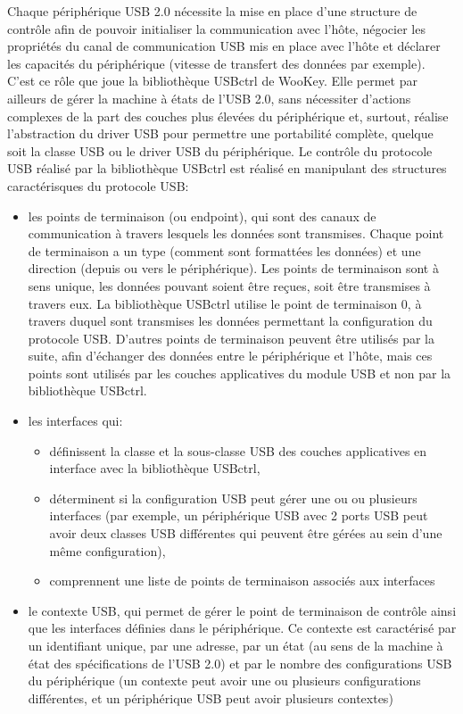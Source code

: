 Chaque périphérique USB 2.0 nécessite la mise en place d'une structure de contrôle afin de pouvoir initialiser la communication avec l'hôte, négocier les propriétés du canal de communication USB mis en place avec l'hôte et déclarer les capacités du périphérique (vitesse de transfert des données par exemple).
\noindent C'est ce rôle que joue la bibliothèque USBctrl de WooKey. Elle permet par ailleurs de gérer la machine à états de l'USB 2.0, sans nécessiter d'actions complexes de la part des couches plus élevées du périphérique et, surtout, réalise l'abstraction du driver USB pour permettre une portabilité complète, quelque soit la classe USB ou le driver USB du périphérique.
\newline \noindent Le contrôle du protocole USB réalisé par la bibliothèque USBctrl est réalisé en manipulant des structures caractérisques du protocole USB:
\begin{itemize}
	\item les points de terminaison (ou endpoint), qui sont des canaux de communication à travers lesquels les données sont transmises. Chaque point de terminaison a un type (comment sont formattées les données) et une direction (depuis ou vers le périphérique). Les points de terminaison sont à sens unique, les données pouvant soient être reçues, soit être transmises à travers eux. La bibliothèque USBctrl utilise le point de terminaison 0, à travers duquel sont transmises les données permettant la configuration du protocole USB. D'autres points de terminaison peuvent être utilisés par la suite, afin d'échanger des données entre le périphérique et l'hôte, mais ces points sont utilisés par les couches applicatives du module USB et non par la bibliothèque USBctrl.
	\item les interfaces qui:
		\begin{itemize}
			\item définissent la classe et la sous-classe USB des couches applicatives en interface avec la bibliothèque USBctrl,
			\item déterminent si la configuration USB peut gérer une ou ou plusieurs interfaces (par exemple, un périphérique USB avec 2 ports USB peut avoir deux classes USB différentes qui peuvent être gérées au sein d'une même configuration),
			\item comprennent une liste de points de terminaison associés aux interfaces
		\end{itemize}
	\item le contexte USB, qui permet de gérer le point de terminaison de contrôle ainsi que les interfaces définies dans le périphérique. Ce contexte est caractérisé par un identifiant unique, par une adresse, par un état (au sens de la machine à état des spécifications de l'USB 2.0) et par le nombre des configurations USB du périphérique (un contexte peut avoir une ou plusieurs configurations différentes, et un périphérique USB peut avoir plusieurs contextes)
\end{itemize}


